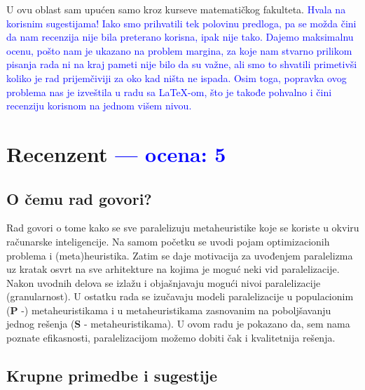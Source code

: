 \documentclass[a4paper]{report}
\newcommand{\odgovor}[1]{\textcolor{blue}{#1}}
\begin{document}
U ovu oblast sam upućen samo kroz kurseve matematičkog fakulteta. \odgovor{Hvala na korisnim sugestijama! Iako smo prihvatili tek polovinu predloga, pa se možda čini da nam recenzija nije bila preterano korisna, ipak nije tako. Dajemo maksimalnu ocenu, pošto nam je ukazano na problem margina, za koje nam stvarno prilikom pisanja rada ni na kraj pameti nije bilo da su važne, ali smo to shvatili primetivši koliko je rad prijemčiviji za oko kad ništa ne ispada. Osim toga, popravka ovog problema nas je izveštila u radu sa LaTeX-om, što je takođe pohvalno i čini recenziju korisnom na jednom višem nivou.}


\chapter{Recenzent \odgovor{--- ocena: 5} }


\section{O čemu rad govori?}
Rad govori o tome kako se sve paralelizuju metaheuristike koje se koriste u okviru računarske inteligencije. Na samom početku se uvodi pojam optimizacionih problema i (meta)heuristika. Zatim se daje motivacija za uvođenjem paralelizma uz kratak osvrt na sve arhitekture na kojima je moguć neki vid paralelizacije. Nakon uvodnih delova se izlažu i objašnjavaju mogući nivoi paralelizacije (granularnost). U ostatku rada se izučavaju modeli paralelizacije u populacionim (\textbf{P} -) metaheuristikama i u metaheuristikama zasnovanim na poboljšavanju jednog rešenja (\textbf{S} - metaheuristikama). U ovom radu je pokazano da, sem nama poznate efikasnosti, paralelizacijom možemo dobiti čak i kvalitetnija rešenja.

\section{Krupne primedbe i sugestije}
\end{document}
